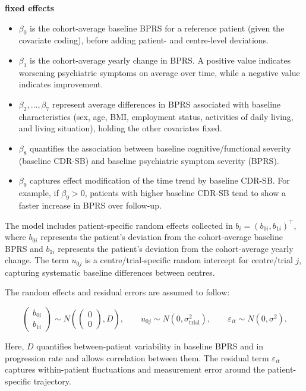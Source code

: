 \documentclass[
  9pt,
  letterpaper,
  DIV=11,
  numbers=noendperiod]{scrartcl}
\providecommand{\tightlist}{%
  \setlength{\itemsep}{0pt}\setlength{\parskip}{0pt}}
\begin{document}
\textbf{fixed effects}

\begin{itemize}
\tightlist
\item
  \(\beta_0\) is the cohort-average baseline BPRS for a reference
  patient (given the covariate coding), before adding patient- and
  centre-level deviations.
\item
  \(\beta_1\) is the cohort-average yearly change in BPRS. A positive
  value indicates worsening psychiatric symptoms on average over time,
  while a negative value indicates improvement.
\item
  \(\beta_2,\dots,\beta_7\) represent average differences in BPRS
  associated with baseline characteristics (sex, age, BMI, employment
  status, activities of daily living, and living situation), holding the
  other covariates fixed.
\item
  \(\beta_8\) quantifies the association between baseline
  cognitive/functional severity (baseline CDR-SB) and baseline
  psychiatric symptom severity (BPRS).
\item
  \(\beta_9\) captures effect modification of the time trend by baseline
  CDR-SB. For example, if \(\beta_9>0\), patients with higher baseline
  CDR-SB tend to show a faster increase in BPRS over follow-up.
\end{itemize}

The model includes patient-specific random effects collected in
\(b_i=(b_{0i},b_{1i})^\top\), where \(b_{0i}\) represents the patient's
deviation from the cohort-average baseline BPRS and \(b_{1i}\)
represents the patient's deviation from the cohort-average yearly
change. The term \(u_{0j}\) is a centre/trial-specific random intercept
for centre/trial \(j\), capturing systematic baseline differences
between centres.

The random effects and residual errors are assumed to follow:

\[
\begin{pmatrix}
b_{0i} \\
b_{1i}
\end{pmatrix}
\sim
N\!\left(
\begin{pmatrix}
0 \\
0
\end{pmatrix},
D
\right),
\qquad
u_{0j} \sim N(0,\sigma^2_{\text{trial}}),
\qquad
\varepsilon_{it} \sim N(0,\sigma^2).
\]

Here, \(D\) quantifies between-patient variability in baseline BPRS and
in progression rate and allows correlation between them. The residual
term \(\varepsilon_{it}\) captures within-patient fluctuations and
measurement error around the patient-specific trajectory.
\end{document}
